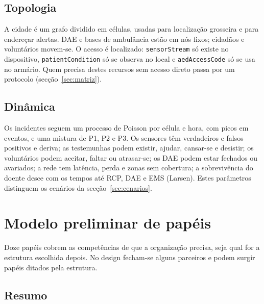 \documentclass[10pt,a4paper]{article}
\newcommand{\id}[1]{\texttt{#1}}
\begin{document}
\subsection{Topologia}\label{sec:topologia}

A cidade é um grafo dividido em células, usadas para localização grosseira e para endereçar alertas. DAE e bases de ambulância estão em nós fixos; cidadãos e voluntários movem-se. O acesso é localizado: \id{sensorStream} só existe no dispositivo, \id{patientCondition} só se observa no local e \id{aedAccessCode} só se usa no armário. Quem precisa destes recursos sem acesso direto passa por um protocolo (secção~\ref{sec:matriz}).

\subsection{Dinâmica}\label{sec:dinamica}

Os incidentes seguem um processo de Poisson por célula e hora, com picos em eventos, e uma mistura de P1, P2 e P3. Os sensores têm verdadeiros e falsos positivos e deriva; as testemunhas podem existir, ajudar, cansar-se e desistir; os voluntários podem aceitar, faltar ou atrasar-se; os DAE podem estar fechados ou avariados; a rede tem latência, perda e zonas sem cobertura; a sobrevivência do doente desce com os tempos até RCP, DAE e EMS (Larsen). Estes parâmetros distinguem os cenários da secção~\ref{sec:cenarios}.

\section{Modelo preliminar de papéis}\label{sec:papeis}

Doze papéis cobrem as competências de que a organização precisa, seja qual for a estrutura escolhida depois. No design fecham-se alguns parceiros e podem surgir papéis ditados pela estrutura.

\subsection{Resumo}\label{sec:papeis-resumo}
\end{document}
